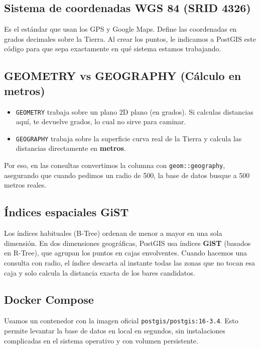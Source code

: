 \documentclass[a4paper,12pt]{article}
\begin{document}
\subsection{Sistema de coordenadas WGS 84 (SRID 4326)}
Es el estándar que usan los GPS y Google Maps. Define las coordenadas en grados decimales sobre la Tierra. Al crear los puntos, le indicamos a PostGIS este código para que sepa exactamente en qué sistema estamos trabajando.

\subsection{GEOMETRY vs GEOGRAPHY (Cálculo en metros)}
\begin{itemize}[leftmargin=1.0cm]
    \item \texttt{GEOMETRY} trabaja sobre un plano 2D plano (en grados). Si calculas distancias aquí, te devuelve grados, lo cual no sirve para caminar.
    \item \texttt{GEOGRAPHY} trabaja sobre la superficie curva real de la Tierra y calcula las distancias directamente en \textbf{metros}.
\end{itemize}
Por eso, en las consultas convertimos la columna con \texttt{geom::geography}, asegurando que cuando pedimos un radio de 500, la base de datos busque a 500 metros reales.

\subsection{Índices espaciales GiST}
Los índices habituales (B-Tree) ordenan de menor a mayor en una sola dimensión. En dos dimensiones geográficas, PostGIS usa índices \textbf{GiST} (basados en R-Tree), que agrupan los puntos en cajas envolventes. Cuando hacemos una consulta con radio, el índice descarta al instante todas las zonas que no tocan esa caja y solo calcula la distancia exacta de los bares candidatos.

\subsection{Docker Compose}
Usamos un contenedor con la imagen oficial \texttt{postgis/postgis:16-3.4}. Esto permite levantar la base de datos en local en segundos, sin instalaciones complicadas en el sistema operativo y con volumen persistente.

\end{document}
